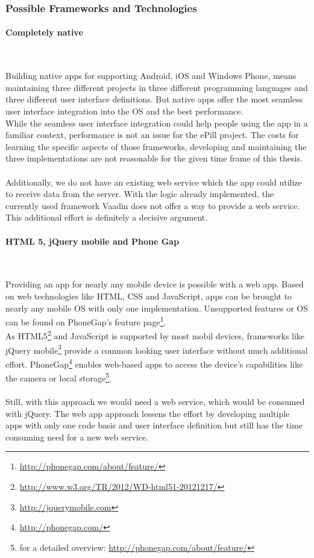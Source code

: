 \subsubsection{Possible Frameworks and Technologies}
\paragraph{Completely native}$\;$

\vspace{0.75em}
Building native apps for supporting Android, iOS and Windows Phone, means maintaining three different projects in three different programming languages and three different user interface definitions. But native apps offer the most seamless user interface integration into the OS and the best performance. 
\\
While the seamless user interface integration could help people using the app in a familiar context, performance is not an issue for the ePill project. The costs for learning the specific aspects of those frameworks, developing and maintaining the three implementations are not reasonable for the given time frame of this thesis.
\\
\\
Additionally, we do not have an existing web service which the app could utilize to receive data from the server. With the logic already implemented, the currently used framework Vaadin does not offer a way to provide a web service. This additional effort is definitely a decisive argument.

\paragraph{HTML 5, jQuery mobile and Phone Gap}$\;$

\vspace{0.75em}
Providing an app for nearly any mobile device is possible with a web app. Based on web technologies like HTML, CSS and JavaScript, apps can be brought to nearly any mobile OS with only one implementation. Unsupported features or OS can be found on PhoneGap's feature page\footnote{\url{http://phonegap.com/about/feature/}}.
\\
As HTML5\footnote{\url{http://www.w3.org/TR/2012/WD-html51-20121217/}} and JavaScript is supported by most mobil devices, frameworks like jQuery mobile\footnote{\url{http://jquerymobile.com}} provide a common looking user interface without much additional effort. PhoneGap\footnote{\url{http://phonegap.com/}} enables web-based apps to access the device's capabilities like the camera or local storage\footnote{for a detailed overview: \url{http://phonegap.com/about/feature/}}.
\\
\\
Still, with this approach we would need a web service, which would be consumed with jQuery. The web app approach lessens the effort by developing multiple apps with only one code basis and user interface definition but still has the time consuming need for a new web service.


